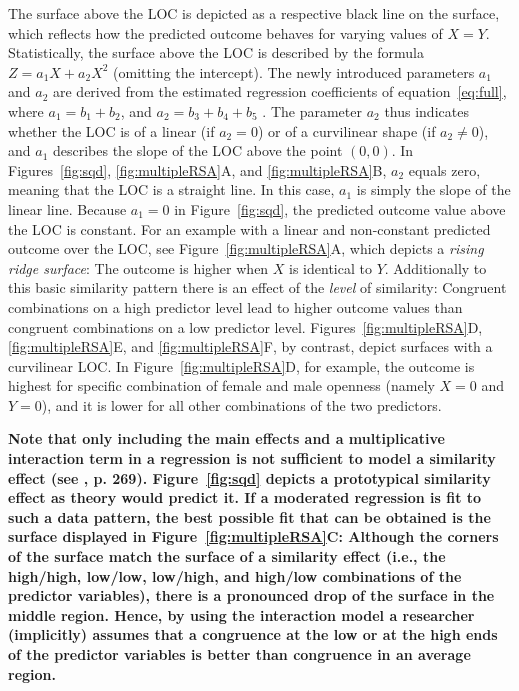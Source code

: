 \documentclass[jou,a4paper,draftfirst]{apa6}
\newcommand{\added}[1]{\textcolor{colour_added}{\bf{#1}}}
\begin{document}
The surface above the LOC is depicted as a respective black line on the surface, which reflects how the predicted outcome behaves for varying values of $X = Y$. Statistically, the surface above the LOC is described by the formula $Z = a_1X + a_2X^2$ (omitting the intercept). The newly introduced parameters $a_1$ and $a_2$ are derived from the estimated regression coefficients of equation~\eqref{eq:full}, where $a_1 = b_1 + b_2$, and $a_2 = b_3 + b_4 + b_5$ \parencite{shanock_polynomial_2010}. The parameter $a_2$ thus indicates whether the LOC is of a linear (if $a_2 = 0$) or of a curvilinear shape (if $a_2 \neq 0$), and $a_1$ describes the slope of the LOC above the point $(0,0)$. In Figures~\ref{fig:sqd}, \ref{fig:multipleRSA}A, and \ref{fig:multipleRSA}B, $a_2$ equals zero, meaning that the LOC is a straight line. In this case, $a_1$ is simply the slope of the linear line. Because $a_1 = 0$ in Figure~\ref{fig:sqd}, the predicted outcome value above the LOC is constant. For an example with a linear and non-constant predicted outcome over the LOC, see Figure~\ref{fig:multipleRSA}A, which depicts a \textit{rising ridge surface}: The outcome is higher when $X$ is identical to $Y$. Additionally to this basic similarity pattern there is an effect of the \textit{level} of similarity: Congruent combinations on a high predictor level lead to higher outcome values than congruent combinations on a low predictor level. Figures~\ref{fig:multipleRSA}D, \ref{fig:multipleRSA}E, and \ref{fig:multipleRSA}F, by contrast, depict surfaces with a curvilinear LOC. In Figure~\ref{fig:multipleRSA}D, for example, the outcome is highest for specific combination of female and male openness (namely $X = 0$ and $Y = 0$), and it is lower for all other combinations of the two predictors.

\added{Note that only including the main effects and a multiplicative interaction term in a regression is not sufficient to model a similarity effect (see \nptextcite{Edwards2001}, p. 269). Figure~\ref{fig:sqd} depicts a prototypical similarity effect as theory would predict it. If a moderated regression is fit to such a data pattern, the best possible fit that can be obtained is the surface displayed in Figure~\ref{fig:multipleRSA}C: Although the corners of the surface match the surface of a similarity effect (i.e., the high/high, low/low, low/high, and high/low combinations of the predictor variables), there is a pronounced drop of the surface in the middle region. Hence, by using the interaction model a researcher (implicitly) assumes that a congruence at the low or at the high ends of the predictor variables is better than congruence in an average region.}
\end{document}

